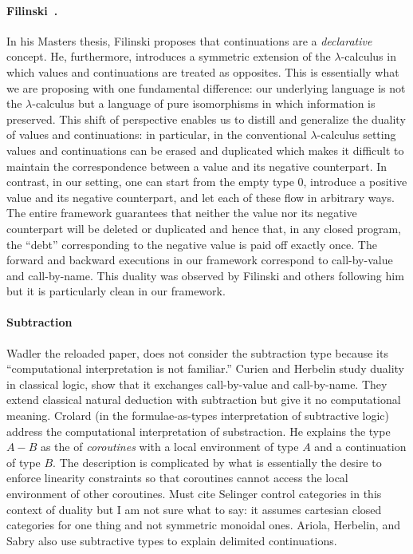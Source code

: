 \documentclass[preprint]{sigplanconf}
\begin{document}
\paragraph*{Filinski~\cite{Filinski:1989:DCI:648332.755574}.}
In his Masters thesis, Filinski proposes that continuations are a
\emph{declarative} concept. He, furthermore, introduces a symmetric extension
of the $\lambda$-calculus in which values and continuations are treated as
opposites. This is essentially what we are proposing with one fundamental
difference: our underlying language is not the $\lambda$-calculus but a
language of pure isomorphisms in which information is preserved. This shift
of perspective enables us to distill and generalize the duality of values and
continuations: in particular, in the conventional $\lambda$-calculus setting
values and continuations can be erased and duplicated which makes it
difficult to maintain the correspondence between a value and its negative
counterpart. In contrast, in our setting, one can start from the empty type
$0$, introduce a positive value and its negative counterpart, and let each of
these flow in arbitrary ways. The entire framework guarantees that neither
the value nor its negative counterpart will be deleted or duplicated and
hence that, in any closed program, the ``debt'' corresponding to the negative
value is paid off exactly once. The forward and backward executions in our
framework correspond to call-by-value and call-by-name. This duality was
observed by Filinski and others following him but it is particularly clean in
our framework.

\paragraph*{Subtraction} Wadler the reloaded paper, does not consider the
subtraction type because its ``computational interpretation is not
familiar.'' Curien and Herbelin study duality in classical logic, show that
it exchanges call-by-value and call-by-name. They extend classical natural
deduction with subtraction but give it no computational meaning. Crolard (in
the formulae-as-types interpretation of subtractive logic) address the
computational interpretation of substraction. He explains the type $A-B$ as
the of \emph{coroutines} with a local environment of type $A$ and a
continuation of type $B$. The description is complicated by what is
essentially the desire to enforce linearity constraints so that coroutines
cannot access the local environment of other coroutines. Must cite Selinger
control categories in this context of duality but I am not sure what to say:
it assumes cartesian closed categories for one thing and not symmetric
monoidal ones. Ariola, Herbelin, and Sabry also use subtractive types to
explain delimited continuations. 
\end{document}

